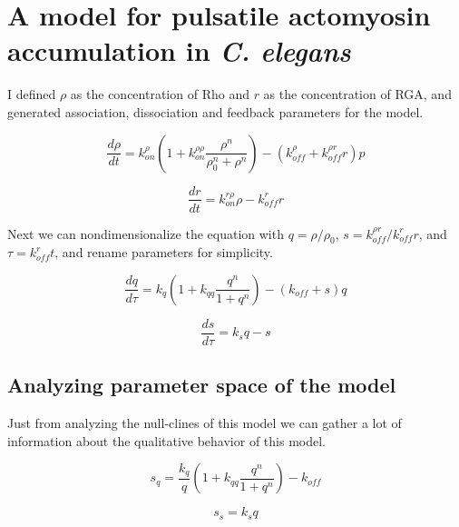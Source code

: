 \section{A model for pulsatile actomyosin accumulation in \textit{C. elegans} }

I defined $\rho$ as the concentration of Rho and $r$ as the concentration of RGA, and generated association, dissociation and feedback parameters for the model. 

\begin{equation}
\label{eqn:rho_1}
	\frac{d\rho}{dt} = k_{on}^\rho \left( 1+k_{on}^{\rho\rho} \frac{\rho^n}{\rho_0^n +\rho^n} \right ) - (k_{off}^\rho + k_{off}^{\rho r} r) p
\end{equation}

\begin{equation}
\label{eqn:rga_1}
	\frac{dr}{dt} = k_{on}^{r \rho}\rho - k_{off}^r r 
\end{equation}

Next we can nondimensionalize the equation with $q=\rho/\rho_0$, $s=k_{off}^{\rho r}/k_{off}^r r$, and $\tau=k_{off}^r t$, and rename parameters for simplicity.

\begin{equation}
	\frac{dq}{d\tau} = k_q \left( 1+k_{qq} \frac{q^n}{1 +q^n} \right ) - (k_{off} + s) q
\end{equation}

\begin{equation}
	\frac{ds}{d\tau} = k_s q - s
\end{equation}




\subsection{Analyzing parameter space of the model}


Just from analyzing the null-clines of this model we can gather a lot of information about the qualitative behavior of this model.  

\begin{equation}
	s_q =\frac{k_q}{q} \left( 1+k_{qq} \frac{q^n}{1 +q^n} \right ) - k_{off} 
\end{equation}

\begin{equation}
	s_s = k_s q
\end{equation}

